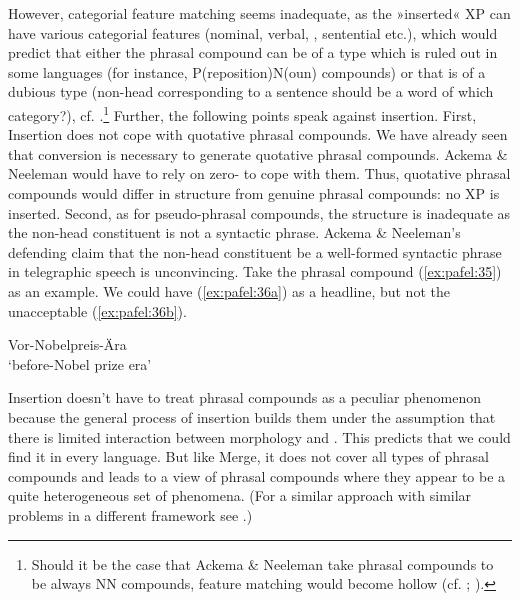 \documentclass[output=paper]{LSP/langsci}
\begin{document}
However, categorial feature matching seems inadequate, as the
»inserted« XP can have various categorial features (nominal, verbal,
, sentential etc.), which would predict that either the
phrasal compound can be of a type which is ruled out in some languages
(for instance, P(reposition)N(oun) compounds) or that is of a dubious
type (non-head corresponding to a sentence should be a word of which
category?), cf. \citet{LS06}.\footnote{Should it be the case that
  Ackema \& Neeleman take phrasal compounds to be always NN compounds,
  feature matching would become hollow
  (cf. \citealt[243]{Meibauer2007}; \citealt[392]{Sato2010}).}
Further, the following points speak against insertion. First,
Insertion does not cope with quotative phrasal compounds. We have
already seen that conversion is necessary to generate quotative
phrasal compounds. Ackema \& Neeleman would have to rely on
zero- to cope with them. Thus, quotative phrasal compounds
would differ in structure from genuine phrasal compounds: no XP is
inserted. Second, as for pseudo-phrasal compounds, the structure is
inadequate as the non-head constituent is not a syntactic
phrase. Ackema \& Neeleman's defending claim that the non-head constituent be a well-formed syntactic phrase in telegraphic speech is unconvincing. Take the phrasal compound (\ref{ex:pafel:35}) as an example. We could have (\ref{ex:pafel:36a}) as a headline, but not the unacceptable (\ref{ex:pafel:36b}).

\ea\label{ex:pafel:35}     
        Vor-Nobelpreis-Ära  \\
      \glt  ‘before-Nobel prize era’
\z

\ea
    \z
\z 

Insertion doesn't have to treat phrasal compounds as a peculiar phenomenon because the general process of insertion builds them under the assumption that there is limited interaction between morphology and . This predicts that we could find it in every language. But like Merge, it does not cover all types of phrasal compounds and leads to a view of phrasal compounds where they appear to be a quite heterogeneous set of phenomena. (For a similar approach with similar problems in a different framework see \citealt{Sato2010}.)
 
\end{document}
